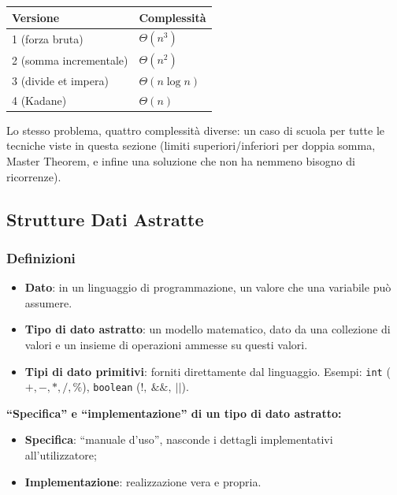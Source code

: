 \documentclass[12pt, a4paper]{article}
\begin{document}
\begin{tcolorbox}[colback=lightergray!10, colframe=tocsec, title=\textbf{Riepilogo delle Quattro Versioni}]
\begin{center}
\begin{tabular}{ll}
\toprule
\textbf{Versione} & \textbf{Complessità} \\
\midrule
1 (forza bruta) & $\Theta(n^3)$ \\
2 (somma incrementale) & $\Theta(n^2)$ \\
3 (divide et impera) & $\Theta(n\log n)$ \\
4 (Kadane) & $\Theta(n)$ \\
\bottomrule
\end{tabular}
\end{center}
Lo stesso problema, quattro complessità diverse: un caso di scuola per tutte le tecniche viste in questa sezione (limiti superiori/inferiori per doppia somma, Master Theorem, e infine una soluzione che non ha nemmeno bisogno di ricorrenze).
\end{tcolorbox}



\subsection{Strutture Dati Astratte}
\label{sec:strutture-dati-astratte}

\subsubsection{Definizioni}

\begin{tcolorbox}[colback=lightergray!10, colframe=tocsec, title=\textbf{Definizioni di Base}]
\begin{itemize}
    \item \textbf{Dato}: in un linguaggio di programmazione, un valore che una variabile può assumere.
    \item \textbf{Tipo di dato astratto}: un modello matematico, dato da una collezione di valori e un insieme di operazioni ammesse su questi valori.
    \item \textbf{Tipi di dato primitivi}: forniti direttamente dal linguaggio. Esempi: \texttt{int} ($+,-,*,/,\%$), \texttt{boolean} ($!,\ \&\&,\ ||$).
\end{itemize}
\end{tcolorbox}

\textbf{``Specifica'' e ``implementazione'' di un tipo di dato astratto:}
\begin{itemize}
    \item \textbf{Specifica}: ``manuale d'uso'', nasconde i dettagli implementativi all'utilizzatore;
    \item \textbf{Implementazione}: realizzazione vera e propria.
\end{itemize}
\end{document}
